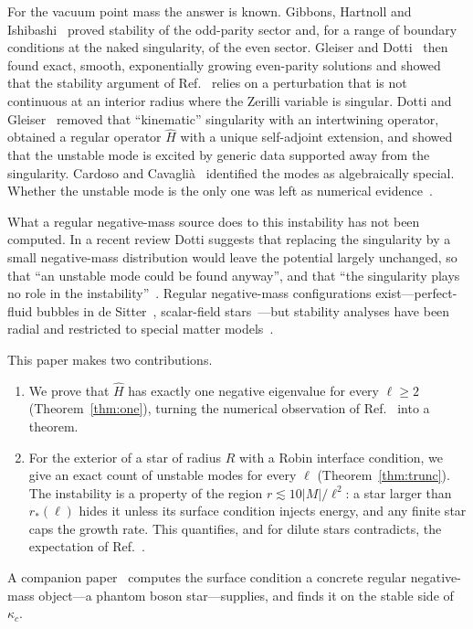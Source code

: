 \documentclass[11pt]{article}
\theoremstyle{remark}
\newcommand{\Hhat}{\hat{H}}
\begin{document}
For the vacuum point mass the answer is known. Gibbons, Hartnoll and Ishibashi~\cite{GHI2005} proved stability of the
odd-parity sector and, for a range of boundary conditions at the naked singularity, of the even sector. Gleiser and
Dotti~\cite{GD2006} then found exact, smooth, exponentially growing even-parity solutions and showed that the stability
argument of Ref.~\cite{GHI2005} relies on a perturbation that is not continuous at an interior radius where the Zerilli
variable is singular. Dotti and Gleiser~\cite{DG2009} removed that ``kinematic'' singularity with an intertwining
operator, obtained a regular operator $\Hhat$ with a unique self-adjoint extension, and showed that the unstable mode is
excited by generic data supported away from the singularity. Cardoso and Cavagli\`a~\cite{CC2006} identified the modes as
algebraically special. Whether the unstable mode is the only one was left as numerical evidence~\cite{DG2009}.

What a regular negative-mass source does to this instability has not been computed. In a recent review Dotti suggests
that replacing the singularity by a small negative-mass distribution would leave the potential largely unchanged, so
that ``an unstable mode could be found anyway'', and that ``the singularity plays no role in the
instability''~\cite{Dotti2022}. Regular negative-mass configurations exist---perfect-fluid bubbles in de
Sitter~\cite{MP2014}, scalar-field stars~\cite{Shirokov2026}---but stability analyses have been radial and restricted to
special matter models~\cite{Johnson2020,Alves2025}.

This paper makes two contributions.
\begin{enumerate}
\item We prove that $\Hhat$ has exactly one negative eigenvalue for every $\ell\ge2$ (Theorem~\ref{thm:one}), turning
the numerical observation of Ref.~\cite{DG2009} into a theorem.
\item For the exterior of a star of radius $R$ with a Robin interface condition, we give an exact count of unstable modes
for every $\ell$ (Theorem~\ref{thm:trunc}). The instability is a property of the region $r\lesssim 10|M|/\ell^2$: a star
larger than $r_*(\ell)$ hides it unless its surface condition injects energy, and any finite star caps the growth rate.
This quantifies, and for dilute stars contradicts, the expectation of Ref.~\cite{Dotti2022}.
\end{enumerate}
A companion paper~\cite{Moinvaziri2026b} computes the surface condition a concrete regular negative-mass object---a
phantom boson star---supplies, and finds it on the stable side of $\kappa_c$.
\end{document}
